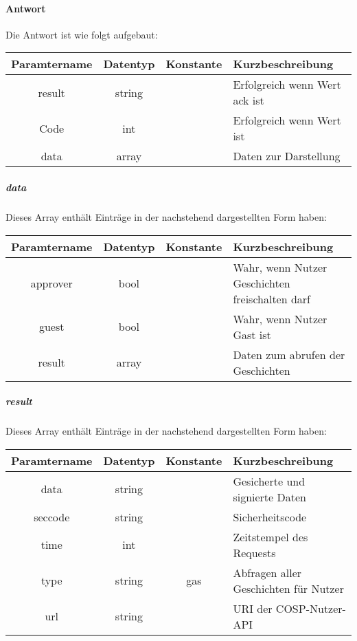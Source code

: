 \paragraph{Antwort}Die Antwort ist wie folgt aufgebaut:
\begin{table}[H]
	\begin{tabular}{|c|c|c|p{6.5cm}|}
		\hline
		\textbf{Paramtername} & \textbf{Datentyp} & \textbf{Konstante} & \textbf{Kurzbeschreibung}                                                                                               \\ \hline
		result              & string           &                 & Erfolgreich wenn Wert {\glqq ack\grqq} ist \\ \hline
		Code                & int              &                 & Erfolgreich wenn Wert {\glqq 0\grqq} ist \\ \hline
		data                & array            &                 & Daten zur Darstellung\\ \hline
	\end{tabular}
\end{table}
\subparagraph{data}Dieses Array enthält Einträge in der nachstehend dargestellten Form haben:
\begin{table}[H]
	\begin{tabular}{|c|c|c|p{6.5cm}|}
		\hline
		\textbf{Paramtername} & \textbf{Datentyp} & \textbf{Konstante} & \textbf{Kurzbeschreibung}    \\ \hline
		approver               & bool            &                 & Wahr, wenn Nutzer Geschichten freischalten darf \\ \hline
		guest                  & bool            &                 & Wahr, wenn Nutzer Gast ist \\ \hline
		result                 & array           &                 & Daten zum abrufen der Geschichten \\ \hline
	\end{tabular}
\end{table}
\subparagraph{result}Dieses Array enthält Einträge in der nachstehend dargestellten Form haben:
\begin{table}[H]
	\begin{tabular}{|c|c|c|p{6.5cm}|}
		\hline
		\textbf{Paramtername} & \textbf{Datentyp} & \textbf{Konstante} & \textbf{Kurzbeschreibung}    \\ \hline
		data                   & string          &                 & Gesicherte und signierte Daten \\ \hline
		seccode                & string          &                 & Sicherheitscode \\ \hline
		time                   & int             &                 & Zeitstempel des Requests \\ \hline
		type                   & string          & gas             & Abfragen aller Geschichten für Nutzer\\ \hline
		url                    & string          &                 & URI der {\glqq COSP\grqq}-Nutzer-API \\ \hline
	\end{tabular}
\end{table}
